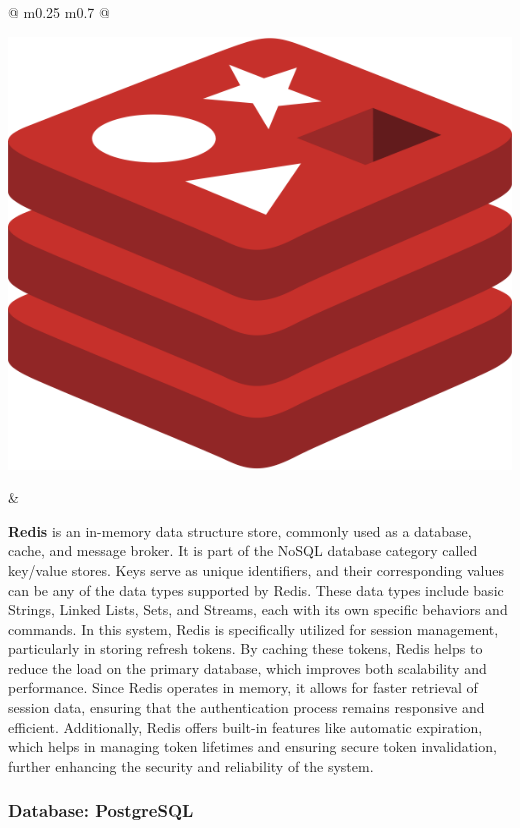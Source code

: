 	
		\vspace*{0.5cm}
	\begin{tabular}{ @{} m{0.25\textwidth} m{0.7\textwidth} @{} }
		\begin{minipage}{\linewidth}
			\centering
			\includegraphics[width=0.5\linewidth]{graphics/redis.png}
			\label{fig:redis}
		\end{minipage}
		&
		\begin{minipage}{\linewidth}
			\textbf{Redis} is an in-memory data structure store, commonly used as a database, cache, and message broker. It is part of the NoSQL database category called key/value stores. Keys serve as unique identifiers, and their corresponding values can be any of the data types supported by Redis. These data types include basic Strings, Linked Lists, Sets, and Streams, each with its own specific behaviors and commands. \cite{redis-what-is} In this system, Redis is specifically utilized for session management, particularly in storing refresh tokens. By caching these tokens, Redis helps to reduce the load on the primary database, which improves both scalability and performance. Since Redis operates in memory, it allows for faster retrieval of session data, ensuring that the authentication process remains responsive and efficient. Additionally, Redis offers built-in features like automatic expiration, which helps in managing token lifetimes and ensuring secure token invalidation, further enhancing the security and reliability of the system.
		\end{minipage}
	\end{tabular}
	
	
	
	\subsubsection{Database: PostgreSQL}
	
